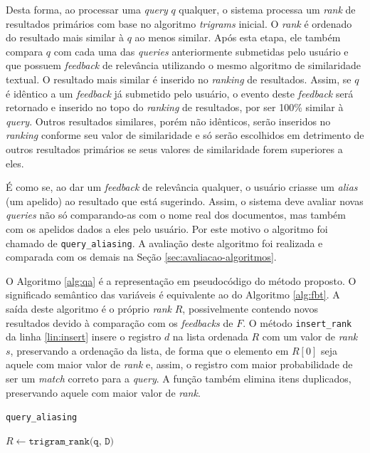 \documentclass[12pt]{article}
\begin{document}
Desta forma, ao processar uma \textit{query} $q$ qualquer, o sistema processa um \textit{rank} de resultados primários com base no algoritmo \textit{trigrams} inicial. O \textit{rank} é ordenado do resultado mais similar à $q$ ao menos similar. Após esta etapa, ele também compara $q$ com cada uma das \textit{queries} anteriormente submetidas pelo usuário e que possuem \textit{feedback} de relevância utilizando o mesmo algoritmo de similaridade textual. O resultado mais similar é inserido no \textit{ranking} de resultados. Assim, se $q$ é idêntico a um \textit{feedback} já submetido pelo usuário, o evento deste \textit{feedback} será retornado e inserido no topo do \textit{ranking} de resultados, por ser 100\% similar à \textit{query}. Outros resultados similares, porém não idênticos, serão inseridos no \textit{ranking} conforme seu valor de similaridade e só serão escolhidos em detrimento de outros resultados primários se seus valores de similaridade forem superiores a eles.

É como se, ao dar um \textit{feedback} de relevância qualquer, o usuário criasse um \textit{alias} (um apelido) ao resultado que está sugerindo. Assim, o sistema deve avaliar novas \textit{queries} não só comparando-as com o nome real dos documentos, mas também com os apelidos dados a eles pelo usuário. Por este motivo o algoritmo foi chamado de \texttt{query\_aliasing}. A avaliação deste algoritmo foi realizada e comparada com os demais na Seção \ref{sec:avaliacao-algoritmos}.

O Algoritmo \ref{alg:qa} é a representação em pseudocódigo do método proposto. O significado semântico das variáveis é equivalente ao do Algoritmo \ref{alg:fbt}. A saída deste algoritmo é o próprio \textit{rank} $R$, possivelmente contendo novos resultados devido à comparação com os \textit{feedbacks} de $F$. O método \texttt{insert\_rank} da linha \ref{lin:insert} insere o registro $d$ na lista ordenada $R$ com um valor de \textit{rank} $s$, preservando a ordenação da lista, de forma que o elemento em $R[0]$ seja aquele com maior valor de \textit{rank} e, assim, o registro com maior probabilidade de ser um \textit{match} correto para a \textit{query}. A função também elimina itens duplicados, preservando aquele com maior valor de \textit{rank}.

\begin{algorithm}
\caption{\texttt{query\_aliasing}}
\label{alg:qa}
\LinesNumbered
{}
\SetAlgoLined
{}

$R \gets \texttt{trigram\_rank(q, D)}$

 \label{li:sum-zero-begin}
\end{algorithm}
\end{document}
